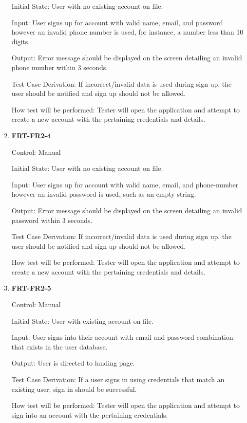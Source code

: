 \documentclass[12pt, titlepage]{article}
\begin{document}
\begin{enumerate}
Initial State: User with no existing account on file.
          
Input: User signs up for account with valid name, email, and password however an
invalid phone number is used, for instance, a number less than 10 digits.
          
Output: Error message should be displayed on the screen detailing an invalid phone number within 3 seconds.

Test Case Derivation: If incorrect/invalid data is used during sign up, the user should be notified and sign up should
not be allowed.

How test will be performed: Tester will open the application and attempt to create a new account with the pertaining credentials and details. 

\item{\textbf{FRT-FR2-4}}

Control: Manual
          
Initial State: User with no existing account on file.
          
Input: User signs up for account with valid name, email, and phone-number however an invalid password
is used, such as an empty string.
          
Output: Error message should be displayed on the screen detailing an invalid password within 3 seconds.

Test Case Derivation: If incorrect/invalid data is used during sign up, the user should be notified and sign up should
not be allowed.

How test will be performed: Tester will open the application and attempt to create a new account with the pertaining credentials and details. 

\item{\textbf{FRT-FR2-5}}

Control: Manual
          
Initial State: User with existing account on file.
          
Input: User signs into their account with email and password combination that exists in the user database.
          
Output: User is directed to landing page.

Test Case Derivation: If a user signs in using credentials that match an existing user, sign in should be successful.
          
How test will be performed: Tester will open the application and attempt to sign into an account with the pertaining credentials.
          

\end{enumerate}
\end{document}
